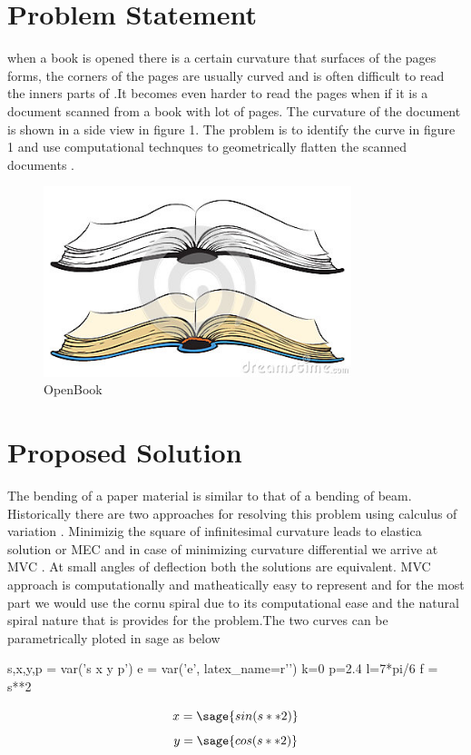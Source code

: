 \documentclass[longbibliography]{revtex4-1}
\begin{document}
\section{Problem Statement}
when a book is opened there is a certain curvature that surfaces of the pages forms, the corners of the pages are usually curved and is often difficult to read the inners parts of .It becomes even harder to read the pages when if it is a document scanned from a book with lot of pages. The curvature of the document is shown in a side view in figure 1. The problem is to identify the curve in figure 1 and use computational technques to geometrically flatten the scanned documents .
\begin{figure}
  \centering
  \caption{OpenBook}
  \includegraphics[width=0.8\textwidth,natwidth=610,natheight=642]{figure1.jpg} 
\end{figure}

\section{Proposed Solution}
The bending of a paper material is similar to that of a bending of beam. Historically there are two approaches for resolving this problem using calculus of variation . Minimizig the square of infinitesimal curvature leads to elastica solution or MEC and in case of minimizing curvature differential we arrive at MVC . At small angles of deflection both the solutions are equivalent. MVC approach is computationally and matheatically easy to represent and for the most part we would use the cornu spiral due to its computational ease and the natural spiral nature that is provides for the problem.The two curves can be parametrically ploted in sage as below

\begin{sagesilent}
s,x,y,p = var('s x y p')
e = var('e', latex_name=r'\vartheta')
k=0
p=2.4
l=7*pi/6
f = s**2
\end{sagesilent}
\[
x=\sage{sin(s**2)}
\]
\[
y=\sage{cos(s**2)}
\]
\begin{center}
\end{center}
\end{document}
